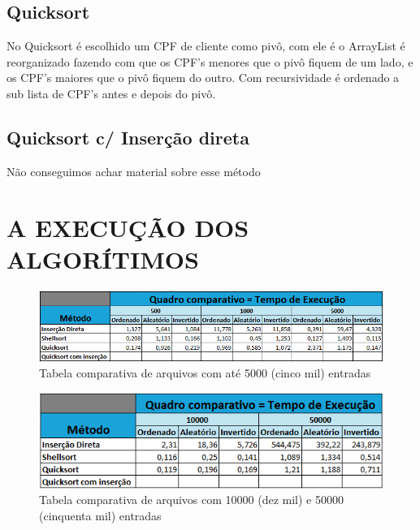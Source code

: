 \documentclass[12pt, a4paper]{FAESATeX}
\begin{document}
    \subsection*{Quicksort}
    No Quicksort é escolhido um CPF de cliente como pivô, com ele é o ArrayList
    é reorganizado fazendo com que os CPF's menores que o pivô fiquem de um
    lado, e os CPF's maiores que o pivô fiquem do outro. Com recursividade é
    ordenado a sub lista de CPF's antes e depois do pivô.

    \subsection*{Quicksort c/ Inserção direta}
    Não conseguimos achar material sobre esse método 

    \fimpagina

    \section{A EXECUÇÃO DOS ALGORÍTIMOS}

    \begin{figure}[h]
        \includegraphics[width=\textwidth]{image3.png}
        \caption[figura 1]{%
            Tabela comparativa de arquivos com até 5000 (cinco mil) entradas%
        }
    \end{figure}
    
    \begin{figure}[h]
        \includegraphics[width=\textwidth]{image4.png}
        \caption[figura 1]{%
            Tabela comparativa de arquivos com 10000 (dez mil) e 50000 (cinquenta mil) entradas%
        }
    \end{figure}
\end{document}
